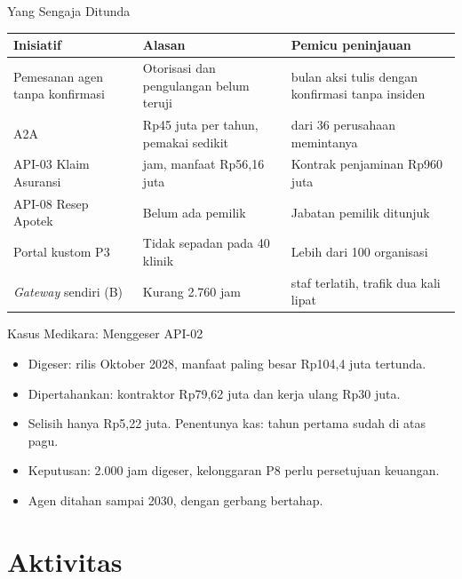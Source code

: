 \documentclass[aspectratio=169, table, 12pt]{beamer}
\begin{document}
\begin{frame}{{\Large Yang Sengaja Ditunda}}
  \scriptsize
  \begin{tabularx}{\textwidth}{>{\raggedright\arraybackslash}p{3.7cm} >{\raggedright\arraybackslash}X >{\raggedright\arraybackslash}X}
    \hline
    \textbf{Inisiatif} & \textbf{Alasan} & \textbf{Pemicu peninjauan} \\ \hline
    Pemesanan agen tanpa konfirmasi & Otorisasi dan pengulangan belum teruji & 6 bulan aksi tulis dengan konfirmasi tanpa insiden \\ \hline
    A2A & Rp45 juta per tahun, pemakai sedikit & 12 dari 36 perusahaan memintanya \\ \hline
    API-03 Klaim Asuransi & 4.167 jam, manfaat Rp56,16 juta & Kontrak penjaminan Rp960 juta \\ \hline
    API-08 Resep Apotek & Belum ada pemilik & Jabatan pemilik ditunjuk \\ \hline
    Portal kustom P3 & Tidak sepadan pada 40 klinik & Lebih dari 100 organisasi \\ \hline
    \textit{Gateway} sendiri (B) & Kurang 2.760 jam & 2 staf terlatih, trafik dua kali lipat \\ \hline
  \end{tabularx}
\end{frame}

\begin{frame}{{\Large Kasus Medikara: Menggeser API-02}}
  \vspace{6pt}
  \begin{itemize}
    \item Digeser: rilis Oktober 2028, manfaat paling besar Rp104,4 juta tertunda.
    \item Dipertahankan: kontraktor Rp79,62 juta dan kerja ulang Rp30 juta.
    \item Selisih hanya Rp5,22 juta. Penentunya kas: tahun pertama sudah di atas pagu.
    \item Keputusan: 2.000 jam digeser, kelonggaran P8 perlu persetujuan keuangan.
    \item Agen ditahan sampai 2030, dengan gerbang bertahap.
  \end{itemize}
\end{frame}

\section{Aktivitas}
\end{document}
